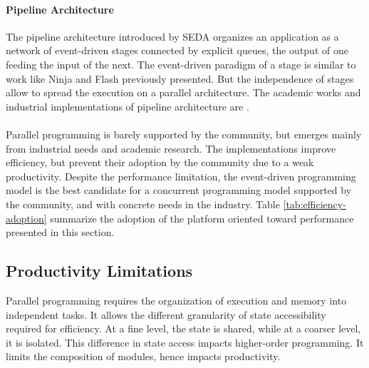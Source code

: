 \paragraph{Pipeline Architecture}

The pipeline architecture introduced by SEDA \cite{Welsh2001} organizes an application as a network of event-driven stages connected by explicit queues, the output of one feeding the input of the next.
The event-driven paradigm of a stage is similar to work like Ninja \cite{Gribble2001} and Flash \cite{Pai1999} previously presented.
But the independence of stages allow to spread the execution on a parallel architecture.
The academic works and industrial implementations of pipeline architecture are .


\paragraph{}

Parallel programming is barely supported by the community, but emerges mainly from industrial needs and academic research.
The implementations improve efficiency, but prevent their adoption by the community due to a weak productivity.
Despite the performance limitation, the event-driven programming model is the best candidate for a concurrent programming model supported by the community, and with concrete needs in the industry.
Table \ref{tab:efficiency-adoption} summarize the adoption of the platform oriented toward performance presented in this section.


\subsection{Productivity Limitations} \label{chapter3:software-efficiency:productivity-limitations}

Parallel programming requires the organization of execution and memory into independent tasks.
It allows the different granularity of state accessibility required for efficiency.
At a fine level, the state is shared, while at a coarser level, it is isolated.
This difference in state access impacts higher-order programming.
It limits the composition of modules, hence impacts productivity.

